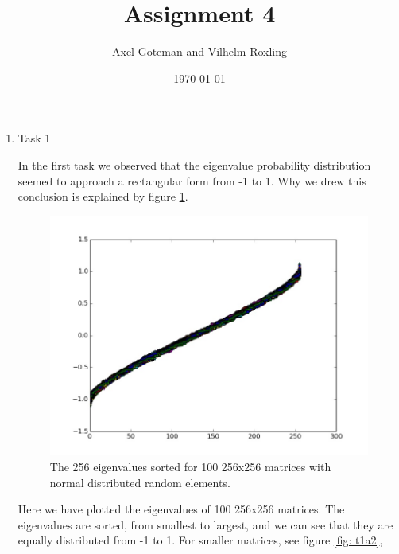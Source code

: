 \documentclass[a4paper]{article}
\title{Assignment 4}
\author{Axel Goteman and Vilhelm Roxling}
\date{\today}
\begin{document}
\maketitle

\begin{enumerate}

\item{Task 1}

In the first task we observed that the eigenvalue probability distribution seemed to approach a rectangular form from -1 to 1. Why we drew this conclusion is explained by figure \ref{fig: t1a1}.

\begin{figure}
\centering
\includegraphics[scale=0.3]{task1_a_1.jpeg}
\caption{\label{fig: t1a1}The 256 eigenvalues sorted for 100 256x256 matrices with normal distributed random elements.}
\end{figure} 
Here we have plotted the eigenvalues of 100 256x256 matrices. The eigenvalues are sorted, from smallest to largest, and we can see that they are equally distributed from -1 to 1. For smaller matrices, see figure \ref{fig: t1a2}, 


\end{enumerate}
\end{document}
